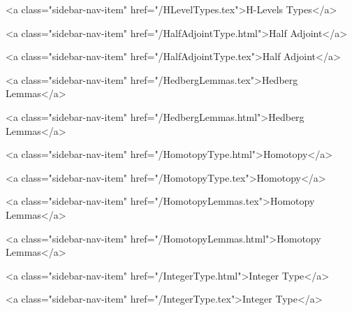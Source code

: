       
        
          <a class="sidebar-nav-item" href="/HLevelTypes.tex">H-Levels Types</a>
        
      
    
      
        
          <a class="sidebar-nav-item" href="/HalfAdjointType.html">Half Adjoint</a>
        
      
    
      
        
          <a class="sidebar-nav-item" href="/HalfAdjointType.tex">Half Adjoint</a>
        
      
    
      
        
          <a class="sidebar-nav-item" href="/HedbergLemmas.tex">Hedberg Lemmas</a>
        
      
    
      
        
          <a class="sidebar-nav-item" href="/HedbergLemmas.html">Hedberg Lemmas</a>
        
      
    
      
        
          <a class="sidebar-nav-item" href="/HomotopyType.html">Homotopy</a>
        
      
    
      
        
          <a class="sidebar-nav-item" href="/HomotopyType.tex">Homotopy</a>
        
      
    
      
        
          <a class="sidebar-nav-item" href="/HomotopyLemmas.tex">Homotopy Lemmas</a>
        
      
    
      
        
          <a class="sidebar-nav-item" href="/HomotopyLemmas.html">Homotopy Lemmas</a>
        
      
    
      
        
          <a class="sidebar-nav-item" href="/IntegerType.html">Integer Type</a>
        
      
    
      
        
          <a class="sidebar-nav-item" href="/IntegerType.tex">Integer Type</a>
        
      
    
